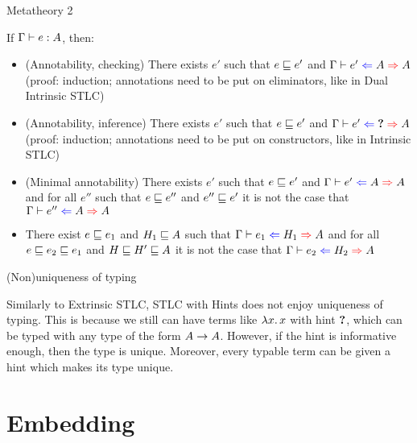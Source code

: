 \documentclass{beamer}
\begin{document}
\begin{frame}{Metatheory 2}

If $\Gamma \vdash e : A$, then:

\begin{itemize}
  \item (Annotability, checking) There exists $e'$ such that $e \sqsubseteq e'$ and $\fullhinting{\Gamma}{e'}{A}{A}$ (proof: induction; annotations need to be put on eliminators, like in Dual Intrinsic STLC)
  \item (Annotability, inference) There exists $e'$ such that $e \sqsubseteq e'$ and $\fullhinting{\Gamma}{e'}{\Hole}{A}$ (proof: induction; annotations need to be put on constructors, like in Intrinsic STLC)
  \item (Minimal annotability) There exists $e'$ such that $e \sqsubseteq e'$ and $\fullhinting{\Gamma}{e'}{A}{A}$ and for all $e''$ such that $e \sqsubseteq e''$ and $e'' \sqsubseteq e'$ it is not the case that $\fullhinting{\Gamma}{e''}{A}{A}$
  \item There exist $e \sqsubseteq e_1$ and $H_1 \sqsubseteq A$ such that $\fullhinting{\Gamma}{e_1}{H_1}{A}$ and for all $e \sqsubseteq e_2 \sqsubseteq e_1$ and $H \sqsubseteq H' \sqsubseteq A$ it is not the case that $\fullhinting{\Gamma}{e_2}{H_2}{A}$
\end{itemize}

\end{frame}

\begin{frame}{(Non)uniqueness of typing}

Similarly to Extrinsic STLC, STLC with Hints does not enjoy uniqueness of typing. This is because we still can have terms like $\lambda x.\, x$ with hint $\textbf{?}$, which can be typed with any type of the form $A \to A$. However, if the hint is informative enough, then the type is unique. Moreover, every typable term can be given a hint which makes its type unique.

\end{frame}

\section{Embedding}
\end{document}
